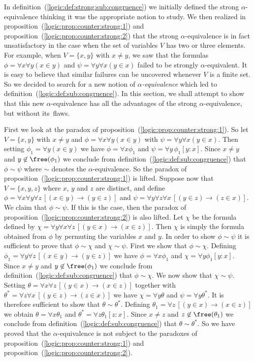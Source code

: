 In definition~(\ref{logic:def:strong:sub:congruence}) we initially
defined the strong $\alpha$-equivalence thinking it was the
appropriate notion to study. We then realized in
proposition~(\ref{logic:prop:counter:strong:1}) and
proposition~(\ref{logic:prop:counter:strong:2}) that the strong 
$\alpha$-equivalence is in fact unsatisfactory in the case when
the set of variables $V$ has two or three elements. For example,
when $V=\{x,y\}$ with $x\neq y$, we saw that the formulas
$\phi=\forall x\forall y(x\in y)$ and $\psi=\forall y\forall x(y\in
x)$ failed to be strongly $\alpha$-equivalent. It is easy to believe 
that similar failures can be uncovered whenever $V$ is a finite set. So we
decided to search for a new notion of {\em $\alpha$-equivalence}
which led to definition~(\ref{logic:def:sub:congruence}). In this
section, we shall attempt to show that this new $\alpha$-equivalence 
has all the advantages of the strong $\alpha$-equivalence, 
but without its~flaws.

First we look at the paradox of
proposition~(\ref{logic:prop:counter:strong:1}). So let $V=\{x,y\}$
with $x\neq y$ and $\phi=\forall x\forall y(x\in y)$ with
$\psi=\forall y\forall x(y\in x)$. Then setting $\phi_{1}=\forall
y(x\in y)$ we have $\phi=\forall x\phi_{1}$ and $\psi=\forall
y\,\phi_{1}[y\!:\!x]$. Since $x\neq y$ and $y\not\in\free(\phi_{1})$
we conclude from definition~(\ref{logic:def:sub:congruence}) that
$\phi\sim\psi$ where $\sim$ denotes the $\alpha$-equivalence. So
the paradox of proposition~(\ref{logic:prop:counter:strong:1}) is
lifted. Suppose now that $V=\{x,y,z\}$ where $x$, $y$ and $z$ are
distinct, and define $\phi= \forall x\forall y\forall z\,[(x\in
y)\to(y\in z)]$ and $\psi=\forall y\forall z\forall x\,[(y\in
z)\to(z\in x)]$. We claim that $\phi\sim\psi$. If this is the case,
then the paradox of proposition~(\ref{logic:prop:counter:strong:2})
is also lifted. Let $\chi$ be the formula defined by $\chi=\forall
y\forall x\forall z\,[(y\in x)\to(x\in z)]$. Then $\chi$ is simply
the formula obtained from $\phi$ by permuting the variables $x$ and
$y$. In order to show $\phi\sim\psi$ it is sufficient to prove that
$\phi\sim\chi$ and $\chi\sim\psi$. First we show that
$\phi\sim\chi$. Defining $\phi_{1}=\forall y\forall z\,[(x\in
y)\to(y\in z)]$ we have $\phi=\forall x\phi_{1}$ and $\chi=\forall
y\phi_{1}[y\!:\!x]$. Since $x\neq y$ and $y\not\in\free(\phi_{1})$
we conclude from definition~(\ref{logic:def:sub:congruence}) that
$\phi\sim\chi$. We now show that $\chi\sim\psi$. Setting
$\theta=\forall x\forall z\,[(y\in x)\to(x\in z)]$ together with
$\theta^{*}=\forall z\forall x\,[(y\in z)\to(z\in x)]$ we have
$\chi=\forall y\theta$ and $\psi=\forall y\theta^{*}$. It is
therefore sufficient to show that $\theta\sim\theta^{*}$. Defining
$\theta_{1}=\forall z\,[(y\in x)\to(x\in z)]$ we obtain
$\theta=\forall x\theta_{1}$ and $\theta^{*}=\forall
z\theta_{1}[z\!:\!x]$. Since $x\neq z$ and
$z\not\in\free(\theta_{1})$ we conclude from
definition~(\ref{logic:def:sub:congruence}) that
$\theta\sim\theta^{*}$. So we have proved that the $\alpha$-equivalence 
is not subject to the paradoxes of
proposition~(\ref{logic:prop:counter:strong:1}) and
proposition~(\ref{logic:prop:counter:strong:2}).



